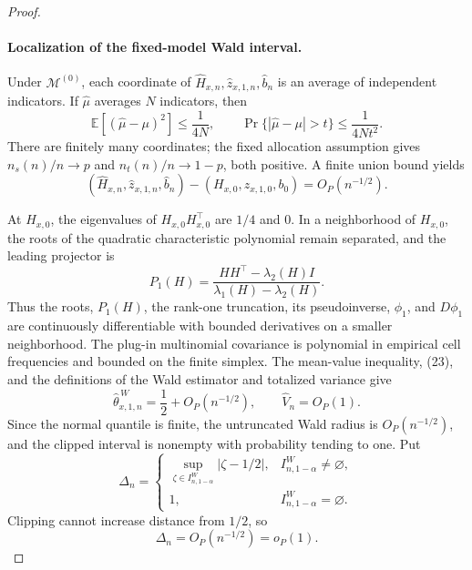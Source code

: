 \documentclass{article}
\begin{document}
\begin{proof}
\paragraph{Localization of the fixed-model Wald interval.}
Under \(\mathcal M^{(0)}\), each coordinate of \(\widehat H_{x,n},\widehat z_{x,1,n},\widehat b_n\) is an average of independent indicators. If \(\widehat\mu\) averages \(N\) indicators, then
\[
\mathbb E[(\widehat\mu-\mu)^2]\le\frac1{4N},
\qquad
\Pr\{|\widehat\mu-\mu|>t\}\le\frac1{4Nt^2}.
\tag{22}
\]
There are finitely many coordinates; the fixed allocation assumption gives \(n_s(n)/n\to p\) and \(n_t(n)/n\to1-p\), both positive. A finite union bound yields
\[
(\widehat H_{x,n},\widehat z_{x,1,n},\widehat b_n)
-(H_{x,0},z_{x,1,0},b_0)=O_P(n^{-1/2}).
\tag{23}
\]

At \(H_{x,0}\), the eigenvalues of \(H_{x,0}H_{x,0}^{\top}\) are \(1/4\) and \(0\). In a neighborhood of \(H_{x,0}\), the roots of the quadratic characteristic polynomial remain separated, and the leading projector is
\[
P_1(H)=\frac{HH^{\top}-\lambda_2(H)I}{\lambda_1(H)-\lambda_2(H)}.
\tag{24}
\]
Thus the roots, \(P_1(H)\), the rank-one truncation, its pseudoinverse, \(\phi_1\), and \(D\phi_1\) are continuously differentiable with bounded derivatives on a smaller neighborhood. The plug-in multinomial covariance is polynomial in empirical cell frequencies and bounded on the finite simplex. The mean-value inequality, (23), and the definitions of the Wald estimator and totalized variance give
\[
\widehat\theta^{\,W}_{x,1,n}=\frac12+O_P(n^{-1/2}),
\qquad
\widehat V_n=O_P(1).
\tag{25}
\]
Since the normal quantile is finite, the untruncated Wald radius is \(O_P(n^{-1/2})\), and the clipped interval is nonempty with probability tending to one. Put
\[
\Delta_n=
\begin{cases}
\sup_{\zeta\in I^W_{n,1-\alpha}}|\zeta-1/2|,
&I^W_{n,1-\alpha}\ne\varnothing,\\
1,&I^W_{n,1-\alpha}=\varnothing.
\end{cases}
\]
Clipping cannot increase distance from \(1/2\), so
\[
\Delta_n=O_P(n^{-1/2})=o_P(1).
\tag{26}
\]


\end{proof}
\end{document}
